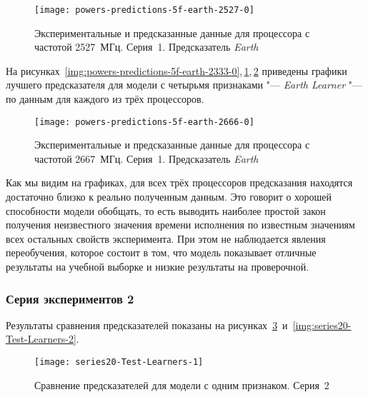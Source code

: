 \begin{figure}
    \begin{center}
        \texttt{[image: powers-predictions-5f-earth-2527-0]}
        \caption{Экспериментальные и предсказанные данные для процессора с частотой 2527~МГц. Серия~1. Предсказатель \textit{Earth}}
        \label{img:powers-predictions-5f-earth-2527-0}
    \end{center}
\end{figure}

На рисунках~\ref{img:powers-predictions-5f-earth-2333-0},\,\ref{img:powers-predictions-5f-earth-2527-0},\,\ref{img:powers-predictions-5f-earth-2666-0} приведены графики лучшего предсказателя для модели с четырьмя признаками "--- \textit{Earth Learner} "--- по данным для каждого из трёх процессоров.

\begin{figure}
    \begin{center}
        \texttt{[image: powers-predictions-5f-earth-2666-0]}
        \caption{Экспериментальные и предсказанные данные для процессора с частотой 2667~МГц. Серия~1. Предсказатель \textit{Earth}}
        \label{img:powers-predictions-5f-earth-2666-0}
    \end{center}
\end{figure}

Как мы видим на графиках, для всех трёх процессоров предсказания находятся достаточно близко к реально полученным данным. Это говорит о хорошей способности модели обобщать, то есть выводить наиболее простой закон получения неизвестного значения времени исполнения по известным значениям всех остальных свойств эксперимента. При этом не наблюдается явления переобучения, которое состоит в том, что модель показывает отличные результаты на учебной выборке и низкие результаты на проверочной.


\subsubsection{Серия экспериментов 2}

Результаты сравнения предсказателей показаны на рисунках~\ref{img:series20-Test-Learners-1}~и~\ref{img:series20-Test-Learners-2}.

\begin{figure}
    \begin{center}
            \texttt{[image: series20-Test-Learners-1]}
            \caption{Сравнение предсказателей для модели с одним признаком. Серия~2} %
            \label{img:series20-Test-Learners-1} %
    \end{center}
\end{figure}

